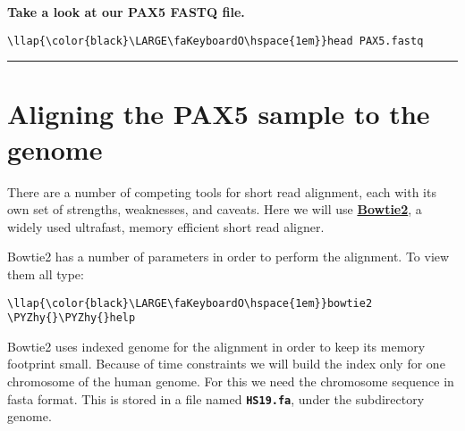 \documentclass[11pt]{article}
\def\PYZhy{\char`\-}
\begin{document}
    \textbf{Take a look at our PAX5 FASTQ file.}





\begin{terminalinput}
\begin{Verbatim}[commandchars=\\\{\}]
\llap{\color{black}\LARGE\faKeyboardO\hspace{1em}}head PAX5.fastq
\end{Verbatim}
\end{terminalinput}



    \begin{center}\rule{0.5\linewidth}{.4pt}\end{center}





\newpage





    \hypertarget{aligning-the-pax5-sample-to-the-genome}{%
\section{Aligning the PAX5 sample to the
genome}\label{aligning-the-pax5-sample-to-the-genome}}

There are a number of competing tools for short read alignment, each
with its own set of strengths, weaknesses, and caveats. Here we will use
\href{http://bowtie-bio.sourceforge.net/bowtie2/index.shtml}{\textbf{Bowtie2}},
a widely used ultrafast, memory efficient short read aligner.

Bowtie2 has a number of parameters in order to perform the alignment. To
view them all type:





\begin{terminalinput}
\begin{Verbatim}[commandchars=\\\{\}]
\llap{\color{black}\LARGE\faKeyboardO\hspace{1em}}bowtie2 \PYZhy{}\PYZhy{}help
\end{Verbatim}
\end{terminalinput}



    Bowtie2 uses indexed genome for the alignment in order to keep its
memory footprint small. Because of time constraints we will build the
index only for one chromosome of the human genome. For this we need the
chromosome sequence in fasta format. This is stored in a file named
\textbf{\texttt{HS19.fa}}, under the subdirectory genome.
\end{document}
